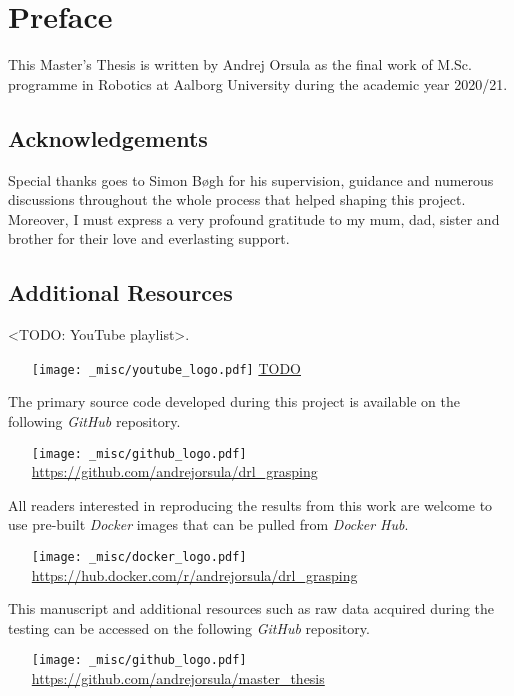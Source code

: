 \chapter*{Preface}

This Master’s Thesis is written by Andrej Orsula as the final work of M.Sc. programme in Robotics at Aalborg University during the academic year 2020/21.


\section*{Acknowledgements}

Special thanks goes to Simon Bøgh for his supervision, guidance and numerous discussions throughout the whole process that helped shaping this project.
Moreover, I must express a very profound gratitude to my mum, dad, sister and brother for their love and everlasting support.


\section*{Additional Resources}

\noindent
<TODO: YouTube playlist>.
\begin{itemize}
    \item[{\texttt{[image: \_misc/youtube\_logo.pdf]}}] \href{TODO}{TODO}
\end{itemize}

\noindent
The primary source code developed during this project is available on the following \textit{GitHub} repository.
\begin{itemize}
    \item[{\texttt{[image: \_misc/github\_logo.pdf]}}] \href{https://github.com/andrejorsula/drl_grasping}{https://github.com/andrejorsula/drl\_grasping}
\end{itemize}

\noindent
All readers interested in reproducing the results from this work are welcome to use pre-built \textit{Docker} images that can be pulled from \textit{Docker Hub}.
\begin{itemize}
    \item[{\texttt{[image: \_misc/docker\_logo.pdf]}}] \href{https://hub.docker.com/r/andrejorsula/drl\_grasping}{https://hub.docker.com/r/andrejorsula/drl\_grasping}
\end{itemize}

\noindent
This manuscript and additional resources such as raw data acquired during the testing can be accessed on the following \textit{GitHub} repository.
\begin{itemize}
    \item[{\texttt{[image: \_misc/github\_logo.pdf]}}] \href{https://github.com/andrejorsula/master_thesis}{https://github.com/andrejorsula/master\_thesis}
\end{itemize}
